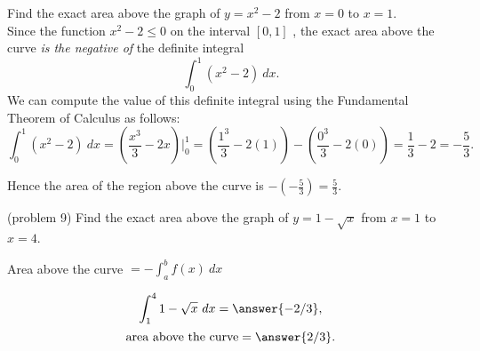 \documentclass{ximera}
\begin{document}
\begin{example}[example 9]
Find the exact area above the graph of $y = x^2 - 2$ from $x = 0$ to $x = 1$. \\
Since the function $x^2 - 2 \leq 0$  on the interval $[0,1]$ , the exact area above the curve \textit{is the negative of} the definite integral 
\[\int_0^1 (x^2 -2) \ dx.\]
We can compute the value of this definite integral using the Fundamental Theorem of Calculus as follows:
\[\int_0^1 (x^2 -2) \ dx = \left(\frac{x^3}{3}-2x\right) \Bigg|_{0}^1 = \left(\frac{1^3}{3}-2(1)\right) - \left(\frac{0^3}{3}- 2(0)\right) = \frac13 - 2 =-\frac53.\]

Hence the area of the region above the curve is $-\left(-\frac53\right) = \frac53$.

\begin{image}
\end{image}
\end{example}


\begin{problem}(problem 9)
Find the exact area above the graph of $y = 1 - \sqrt x$ from $x = 1$ to $x = 4$. \\
\begin{hint}
Area above the curve $= -\int_a^b f(x) \ dx$
\end{hint}
\[\int_1^4 1 - \sqrt x \ dx = \answer{-2/3},\]
\[\text{area above the curve} = \answer{2/3}.\]
\end{problem}
\end{document}
